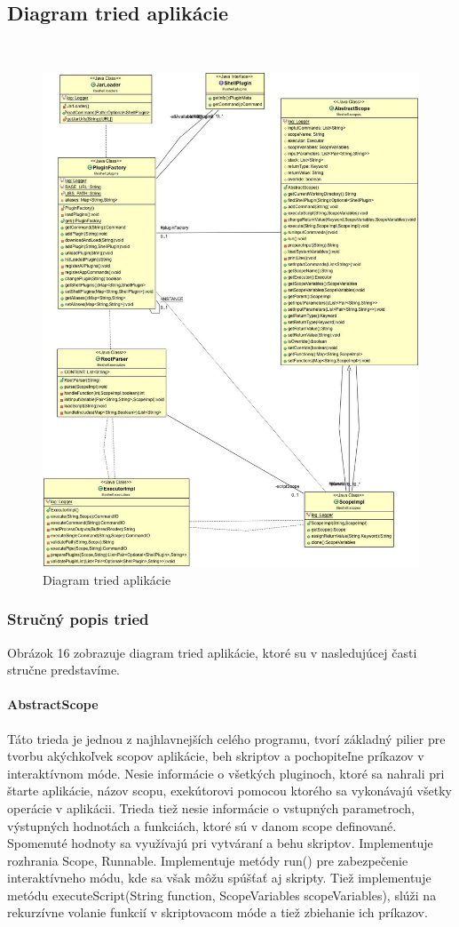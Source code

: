 \newpage
\subsection{Diagram tried aplikácie}
 \begin{figure}[!htbp]
	\centering
	\includegraphics[scale=0.4]{img/ClassApplication.jpg}
	\caption{Diagram tried aplikácie}
	\label{fig:test}
\end{figure}
\subsubsection{Stručný popis tried}
\indent Obrázok 16 zobrazuje diagram tried aplikácie, ktoré su v nasledujúcej časti stručne predstavíme.
\paragraph{AbstractScope}
Táto trieda je jednou z najhlavnejších celého programu, tvorí základný pilier pre tvorbu akýchkoľvek scopov aplikácie, beh skriptov a pochopiteľne príkazov v interaktívnom móde. Nesie informácie o všetkých pluginoch, ktoré sa nahrali pri štarte aplikácie, názov scopu, exekútorovi pomocou ktorého sa vykonávajú všetky operácie v aplikácii. Trieda tiež nesie informácie o vstupných parametroch, výstupných hodnotách a funkciách, ktoré sú v danom scope definované. Spomenuté hodnoty sa využívajú pri vytváraní a behu skriptov. Implementuje rozhrania Scope, Runnable. Implementuje metódy run() pre zabezpečenie interaktívneho módu, kde sa však môžu spúšťať aj skripty. Tiež implementuje metódu executeScript(String function, ScopeVariables scopeVariables), slúži na rekurzívne volanie funkcií v skriptovacom móde a tiež  zbiehanie ich príkazov.
